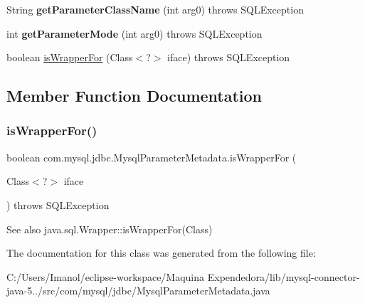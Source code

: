 \begin{DoxyCompactItemize}
String {\bfseries get\+Parameter\+Class\+Name} (int arg0)  throws S\+Q\+L\+Exception 
\item 
\mbox{\label{classcom_1_1mysql_1_1jdbc_1_1_mysql_parameter_metadata_a66cc25be045f6e0472ae0d82855802c9}} 
int {\bfseries get\+Parameter\+Mode} (int arg0)  throws S\+Q\+L\+Exception 
\item 
boolean \mbox{\hyperlink{classcom_1_1mysql_1_1jdbc_1_1_mysql_parameter_metadata_a647be038626dcdcacb16f8614ac1fff8}{is\+Wrapper\+For}} (Class$<$?$>$ iface)  throws S\+Q\+L\+Exception 
\end{DoxyCompactItemize}


\subsection{Member Function Documentation}
\mbox{\label{classcom_1_1mysql_1_1jdbc_1_1_mysql_parameter_metadata_a647be038626dcdcacb16f8614ac1fff8}} 
\subsubsection{\texorpdfstring{is\+Wrapper\+For()}{isWrapperFor()}}
{\footnotesize\ttfamily boolean com.\+mysql.\+jdbc.\+Mysql\+Parameter\+Metadata.\+is\+Wrapper\+For (\begin{DoxyParamCaption}\item[{Class$<$?$>$}]{iface }\end{DoxyParamCaption}) throws S\+Q\+L\+Exception}

\begin{DoxySeeAlso}{See also}
java.\+sql.\+Wrapper\+::is\+Wrapper\+For(\+Class) 
\end{DoxySeeAlso}


The documentation for this class was generated from the following file\+:\begin{DoxyCompactItemize}
\item 
C\+:/\+Users/\+Imanol/eclipse-\/workspace/\+Maquina Expendedora/lib/mysql-\/connector-\/java-\/5../src/com/mysql/jdbc/Mysql\+Parameter\+Metadata.\+java\end{DoxyCompactItemize}
